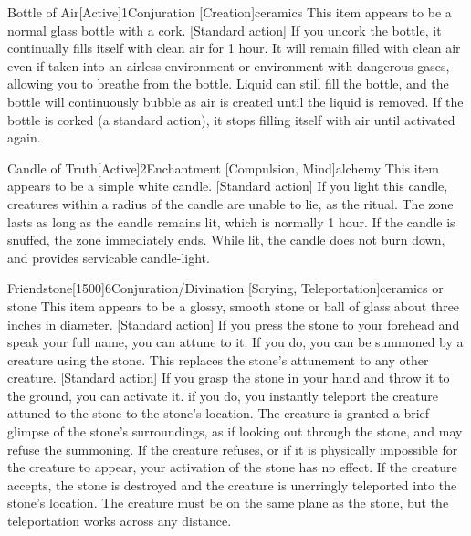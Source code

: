         \begin{magicitemdef}{Bottle of Air}[Active]{1}{Conjuration [Creation]}{ceramics}
            This item appears to be a normal glass bottle with a cork.
            [Standard action] If you uncork the bottle, it continually fills itself with clean air for 1 hour.
            It will remain filled with clean air even if taken into an airless environment or environment with dangerous gases, allowing you to breathe from the bottle.
            Liquid can still fill the bottle, and the bottle will continuously bubble as air is created until the liquid is removed.
            If the bottle is corked (a standard action), it stops filling itself with air until activated again.
        \end{magicitemdef}

        \begin{magicitemdef}{Candle of Truth}[Active]{2}{Enchantment [Compulsion, Mind]}{alchemy}
            This item appears to be a simple white candle.
            [Standard action] If you light this candle, creatures within a \areamed radius of the candle are unable to lie, as the  ritual.
            The zone lasts as long as the candle remains lit, which is normally 1 hour.
            If the candle is snuffed, the zone immediately ends.
            While lit, the candle does not burn down, and provides servicable candle-light.
        \end{magicitemdef}

        \begin{magicitemdef}{Friendstone}[1500]{6}{Conjuration/Divination [Scrying, Teleportation]}{ceramics or stone}
            This item appears to be a glossy, smooth stone or ball of glass about three inches in diameter.
            [Standard action] If you press the stone to your forehead and speak your full name, you can attune to it.
            If you do, you can be summoned by a creature using the stone.
            This replaces the stone's attunement to any other creature.
            [Standard action] If you grasp the stone in your hand and throw it to the ground, you can activate it.
            if you do, you instantly teleport the creature attuned to the stone to the stone's location.
            The creature is granted a brief glimpse of the stone's surroundings, as if looking out through the stone, and may refuse the summoning.
            If the creature refuses, or if it is physically impossible for the creature to appear, your activation of the stone has no effect.
            If the creature accepts, the stone is destroyed and the creature is unerringly teleported into the stone's location.
            The creature must be on the same plane as the stone, but the teleportation works across any distance.
        \end{magicitemdef}

